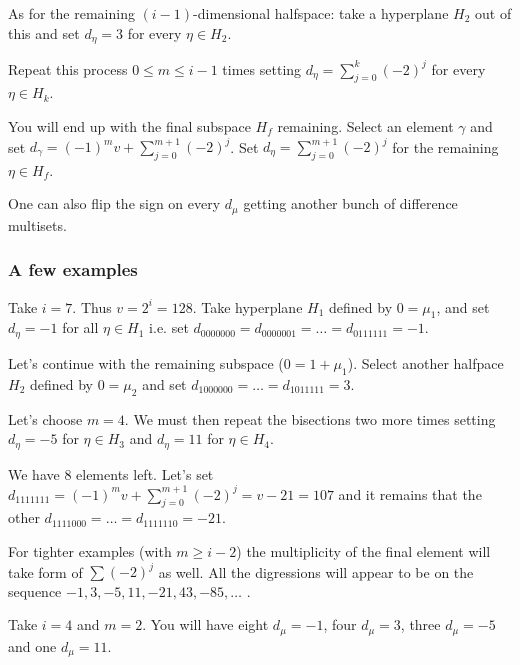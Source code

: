         As for the remaining $(i-1)$-dimensional halfspace: take a hyperplane $H_2$ out of this and set $d_\eta = 3$ for every $\eta \in H_2$.
        
        Repeat this process $0 \leq m \leq i-1$ times setting $d_\eta = \sum\limits_{j=0}^k (-2)^j$ for every $\eta \in H_k$.
        
        You will end up with the final subspace $H_f$ remaining. Select an element $\gamma$ and set $d_\gamma = (-1)^m v + \sum\limits_{j=0}^{m+1} (-2)^j$. Set $d_\eta = \sum\limits_{j=0}^{m+1} (-2)^j$ for the remaining $\eta \in H_f$.
        
        One can also flip the sign on every $d_\mu$ getting another bunch of difference multisets.
        
    \subsubsection{A few examples}
        
        \begin{example}
            Take $i=7$. Thus $v=2^i=128$. Take hyperplane $H_1$ defined by $0=\mu_1$, and set $d_\eta=-1$ for all $\eta\in H_1$ i.e. set $d_{0000000}=d_{0000001}=\ldots=d_{0111111}=-1$.
            
            Let's continue with the remaining subspace ($0=1+\mu_1$). Select another halfpace $H_2$ defined by $0=\mu_2$ and set $d_{1000000}=\ldots=d_{1011111}=3$.
            
            Let's choose $m=4$. We must then repeat the bisections two more times setting $d_\eta=-5$ for $\eta\in H_3$ and $d_\eta=11$ for $\eta \in H_4$.
            
            We have 8 elements left. Let's set $d_{1111111} = (-1)^{m} v + \sum\limits_{j=0}^{m+1} (-2)^j = v - 21 = 107$ and it remains that the other $d_{1111000}=\ldots=d_{1111110}=-21$.
        \end{example}
        
        For tighter examples (with $m\geq i-2$) the multiplicity of the final element will take form of $\sum (-2)^j$ as well. All the digressions will appear to be on the sequence $-1,3,-5,11,-21,43,-85,\ldots$ \cite{A077925}.
        
        \begin{example}
          Take $i=4$ and $m=2$. You will have eight $d_\mu=-1$, four $d_\mu=3$, three $d_\mu=-5$ and one $d_\mu=11$.
        \end{example}
        
